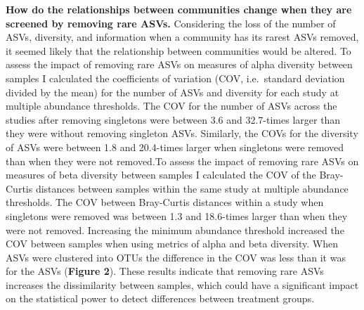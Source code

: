 \documentclass[]{article}
\begin{document}
\textbf{How do the relationships between communities change when they
are screened by removing rare ASVs.} Considering the loss of the number
of ASVs, diversity, and information when a community has its rarest ASVs
removed, it seemed likely that the relationship between communities
would be altered. To assess the impact of removing rare ASVs on measures
of alpha diversity between samples I calculated the coefficients of
variation (COV, i.e.~standard deviation divided by the mean) for the
number of ASVs and diversity for each study at multiple abundance
thresholds. The COV for the number of ASVs across the studies after
removing singletons were between 3.6 and 32.7-times larger than they
were without removing singleton ASVs. Similarly, the COVs for the
diversity of ASVs were between 1.8 and 20.4-times larger when singletons
were removed than when they were not removed.To assess the impact of
removing rare ASVs on measures of beta diversity between samples I
calculated the COV of the Bray-Curtis distances between samples within
the same study at multiple abundance thresholds. The COV between
Bray-Curtis distances within a study when singletons were removed was
between 1.3 and 18.6-times larger than when they were not removed.
Increasing the minimum abundance threshold increased the COV between
samples when using metrics of alpha and beta diversity. When ASVs were
clustered into OTUs the difference in the COV was less than it was for
the ASVs (\textbf{Figure 2}). These results indicate that removing rare
ASVs increases the dissimilarity between samples, which could have a
significant impact on the statistical power to detect differences
between treatment groups.
\end{document}
